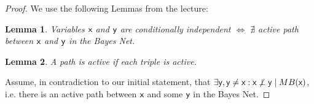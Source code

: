 \documentclass[12pt,a4paper,oneside]{article}
\newtheorem{lem}{Lemma}
\newtheorem{thm}{Theorem}
\newcommand{\LR}{\Leftrightarrow}
\begin{document}

\begin{proof}

\noindent
We use the following Lemmas from the lecture:

\begin{lem}
Variables $\rv{x}$ and $\rv{y}$ are conditionally independent $\LR$ $\nexists$ active path between $\rv{x}$ and $\rv{y}$ in the Bayes Net.
\end{lem}

\begin{lem}
A path is active if each triple is active.
\end{lem}


\noindent
Assume, in contradiction to our initial statement, that $\exists \rv{y}, \rv{y} \neq \rv{x}: \rv{x} \not\perp \rv{y} \; | \; MB(\rv{x})$, i.e. there is an active path between $\rv{x}$ and some $\rv{y}$ in the Bayes Net.


\end{proof}
\end{document}
